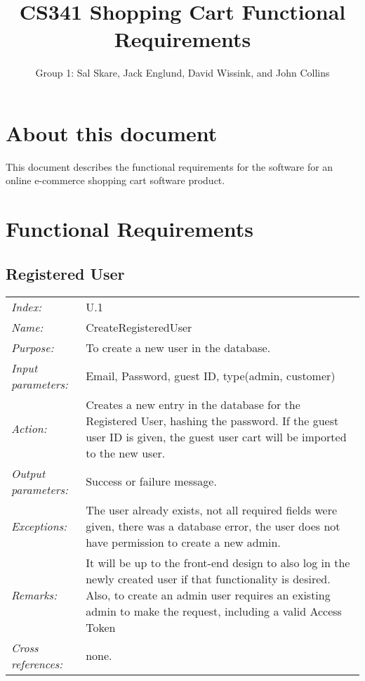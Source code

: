 \documentclass[10pt,letter]{article}
\begin{document}

\title{CS341 Shopping Cart Functional Requirements}

\author{Group 1: Sal Skare, Jack Englund, David Wissink, and John Collins}

\maketitle 

\section{About this document} This document describes the functional requirements for the 
software for an online e-commerce shopping cart software product.

\section{Functional Requirements}

\subsection{Registered User}

\begin{tabularx}{\textwidth}{l X}
    \it{Index:} & U.1 \\
    \it{Name:} & CreateRegisteredUser \\
    \it{Purpose:} & To create a new user in the database. \\
    \it{Input parameters:} & Email, Password, guest ID, type(admin, customer)\\
    \it{Action:} & Creates a new entry in the database for the Registered User, hashing the password. If the guest 
    user ID is given, the guest user cart will be imported to the new user.\\
    \it{Output parameters:} & Success or failure message. \\
    \it{Exceptions:} & The user already exists, not all required fields were given, there 
    was a database error, the user does not have permission to create a new admin. \\
    \it{Remarks:} & It will be up to the front-end design to also log in the newly created 
    user if that functionality is desired. Also, to create an admin user requires an existing admin
    to make the request, including a valid Access Token\\
    \it{Cross references:} & none. \\
    \hline
\end{tabularx}
\end{document}
